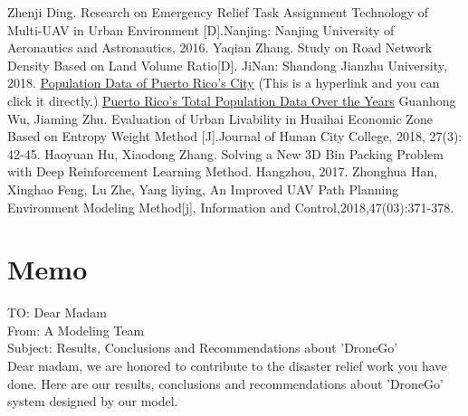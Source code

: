 \documentclass{mcmthesis}
\begin{document}
\begin{thebibliography}{99}                
	 Zhenji Ding. Research on Emergency Relief Task Assignment Technology of Multi-UAV in Urban Environment [D].Nanjing: Nanjing University of Aeronautics and Astronautics, 2016. 
	 Yaqian Zhang. Study on Road Network Density Based on Land Volume Ratio[D]. JiNan: Shandong Jianzhu University, 2018.
	 \href{https://en.wikipedia.org/wiki/Municipalities_of_Puerto_Rico#cite_note-census-2010-11?tdsourcetag=s_pcqq_aiomsg} {Population Data of Puerto Rico's City} (This is a hyperlink and you can click it directly.)
	 \href{https://en.wikipedia.org/wiki/Puerto_Rico#Population_makeup}{Puerto Rico's Total Population Data Over the Years}
	 Guanhong Wu, Jiaming Zhu. Evaluation of Urban Livability in Huaihai Economic Zone Based on Entropy Weight Method [J].Journal of Hunan City College, 2018, 27(3): 42-45. 
	 Haoyuan Hu, Xiaodong Zhang. Solving a New 3D Bin Packing Problem with Deep Reinforcement Learning Method. Hangzhou, 2017.
	 Zhonghua Han, Xinghao Feng, Lu Zhe, Yang liying, An Improved UAV Path Planning Environment Modeling Method[j], Information and Control,2018,47(03):371-378.
\end{thebibliography}

\section{Memo}

\noindent TO: Dear Madam  \\
From: A Modeling Team  \\
Subject: Results, Conclusions and Recommendations about 'DroneGo'  \\

Dear madam, we are honored to contribute to the disaster relief work you have done. Here are our results, conclusions and recommendations about 'DroneGo' system designed by our model.
\end{document}
